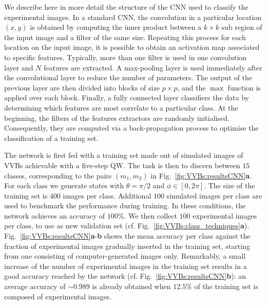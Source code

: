 We describe here in more detail the structure of the \ac{CNN} used to classify the experimental images.
In a standard \ac{CNN}, the convolution in a particular location $(x,y)$ is obtained by computing the inner product between a $k \times k$ sub region of the input image and a filter of the same size. Repeating this process for each location on the input image, it is possible to obtain an activation map associated to specific features. Typically, more than one filter is used in one convolution layer and $N$ features are extracted.
A max-pooling layer is used immediately after the convolutional layer to reduce the number of parameters. The output of the previous layer are then divided into blocks of size $p \times p$, and the $\max$ function is applied over each block.
Finally, a fully connected layer classifiers the data by determining which features are most correlate to a particular class.
At the beginning, the filters of the features extractors are randomly initialised. Consequently, they are computed via a back-propagation process to optimise the classification of a training set.

The network is first fed with a training set made out of simulated images of \acp{VVB} achievable with a five-step \ac{QW}.
The task is then to discern between $15$ classes, corresponding to the pairs $(m_1,m_2)$ in Fig.~\ref{fig:VVBs:resultsCNN}\textbf{a}.
For each class we generate states with $\theta=\pi/2$ and $\phi\in[0,2\pi]$. The size of the training set is $400$ images per class. Additional $100$ simulated images per class are used to benchmark the performance during training. In these conditions, the network achieves an accuracy of $100\%$. 
We then collect $100$ experimental images per class, to use as new validation set (cf. Fig.~\ref{fig:VVBs:class_techniques}{\bf a}). Fig.~\ref{fig:VVBs:resultsCNN}{\bf a}-{\bf b} shows the mean accuracy per class against the fraction of experimental images gradually inserted in the training set, starting from one consisting of computer-generated images only.
Remarkably, a small increase of the number of experimental images in the training set results in a good accuracy reached by the network (cf. Fig.~\ref{fig:VVBs:resultsCNN}{\bf b}): an average accuracy of $\sim 0.989$ is already obtained when $12.5\%$ of the training set is composed of experimental images.


